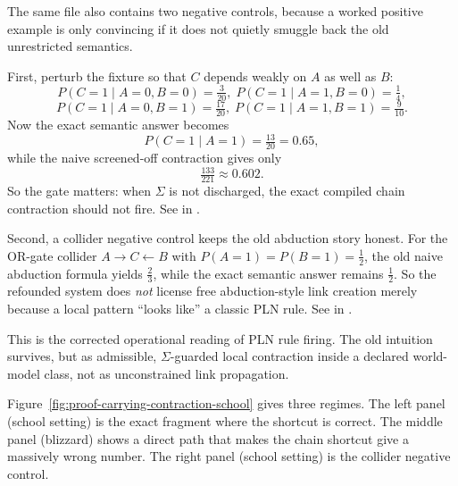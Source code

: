\documentclass[11pt,openany]{report}
\begin{document}
The same file also contains two negative controls, because a worked
positive example is only convincing if it does not quietly smuggle back
the old unrestricted semantics.

First, perturb the fixture so that $C$ depends weakly on $A$ as well as
$B$:
\[
  P(C{=}1 \mid A{=}0,B{=}0)=\tfrac3{20},\;
  P(C{=}1 \mid A{=}1,B{=}0)=\tfrac14,
\]
\[
  P(C{=}1 \mid A{=}0,B{=}1)=\tfrac{17}{20},\;
  P(C{=}1 \mid A{=}1,B{=}1)=\tfrac9{10}.
\]
Now the exact semantic answer becomes
\[
  P(C{=}1 \mid A{=}1)=\tfrac{13}{20}=0.65,
\]
while the naive screened-off contraction gives only
\[
  \tfrac{133}{221}\approx 0.602.
\]
So the gate matters: when $\Sigma$ is not discharged, the exact compiled
chain contraction should not fire.  See
 in
.

Second, a collider negative control keeps the old abduction story honest.
For the OR-gate collider $A \to C \leftarrow B$ with
$P(A{=}1)=P(B{=}1)=\tfrac12$, the old naive abduction formula yields
$\tfrac23$, while the exact semantic answer remains $\tfrac12$.  So the
refounded system does \emph{not} license free abduction-style link
creation merely because a local pattern ``looks like'' a classic PLN
rule.  See  in
.

This is the corrected operational reading of PLN rule firing.  The old
intuition survives, but as admissible, $\Sigma$-guarded local contraction
inside a declared world-model class, not as unconstrained link
propagation.

Figure~\ref{fig:proof-carrying-contraction-school} gives three regimes.
The left panel (school setting) is the exact fragment where the shortcut
is correct.  The middle panel (blizzard) shows a direct path that makes
the chain shortcut give a massively wrong number.  The right panel
(school setting) is the collider negative control.
\end{document}
